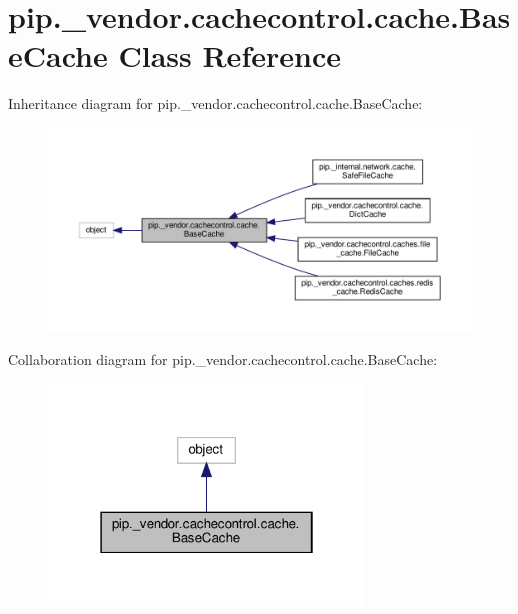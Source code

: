 \hypertarget{classpip_1_1__vendor_1_1cachecontrol_1_1cache_1_1BaseCache}{}\section{pip.\+\_\+vendor.\+cachecontrol.\+cache.\+Base\+Cache Class Reference}
\label{classpip_1_1__vendor_1_1cachecontrol_1_1cache_1_1BaseCache}


Inheritance diagram for pip.\+\_\+vendor.\+cachecontrol.\+cache.\+Base\+Cache\+:
\nopagebreak
\begin{figure}[H]
\begin{center}
\leavevmode
\includegraphics[width=350pt]{classpip_1_1__vendor_1_1cachecontrol_1_1cache_1_1BaseCache__inherit__graph}
\end{center}
\end{figure}


Collaboration diagram for pip.\+\_\+vendor.\+cachecontrol.\+cache.\+Base\+Cache\+:
\nopagebreak
\begin{figure}[H]
\begin{center}
\leavevmode
\includegraphics[width=238pt]{classpip_1_1__vendor_1_1cachecontrol_1_1cache_1_1BaseCache__coll__graph}
\end{center}
\end{figure}
